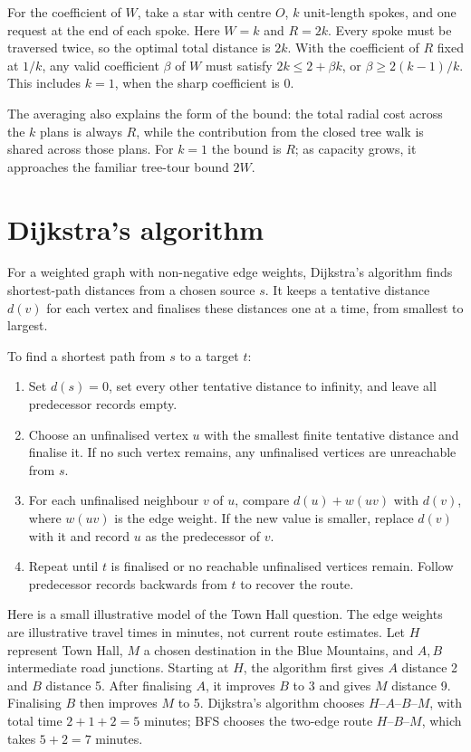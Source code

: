 For the coefficient of $W$, take a star with centre $O$, $k$ unit-length spokes, and one request at the end of each spoke. Here $W=k$ and $R=2k$. Every spoke must be traversed twice, so the optimal total distance is $2k$. With the coefficient of $R$ fixed at $1/k$, any valid coefficient $\beta$ of $W$ must satisfy $2k\leq 2+\beta k$, or $\beta\geq 2(k-1)/k$. This includes $k=1$, when the sharp coefficient is $0$.

The averaging also explains the form of the bound: the total radial cost across the $k$ plans is always $R$, while the contribution from the closed tree walk is shared across those plans. For $k=1$ the bound is $R$; as capacity grows, it approaches the familiar tree-tour bound $2W$.

\section{Dijkstra's algorithm}
For a weighted graph with non-negative edge weights, Dijkstra's algorithm finds shortest-path distances from a chosen source $s$. It keeps a tentative distance $d(v)$ for each vertex and finalises these distances one at a time, from smallest to largest.

To find a shortest path from $s$ to a target $t$:
\begin{enumerate}
\item Set $d(s)=0$, set every other tentative distance to infinity, and leave all predecessor records empty.
\item Choose an unfinalised vertex $u$ with the smallest finite tentative distance and finalise it. If no such vertex remains, any unfinalised vertices are unreachable from $s$.
\item For each unfinalised neighbour $v$ of $u$, compare $d(u)+w(uv)$ with $d(v)$, where $w(uv)$ is the edge weight. If the new value is smaller, replace $d(v)$ with it and record $u$ as the predecessor of $v$.
\item Repeat until $t$ is finalised or no reachable unfinalised vertices remain. Follow predecessor records backwards from $t$ to recover the route.
\end{enumerate}

Here is a small illustrative model of the Town Hall question. The edge weights are illustrative travel times in minutes, not current route estimates. Let $H$ represent Town Hall, $M$ a chosen destination in the Blue Mountains, and $A,B$ intermediate road junctions. Starting at $H$, the algorithm first gives $A$ distance 2 and $B$ distance 5. After finalising $A$, it improves $B$ to 3 and gives $M$ distance 9. Finalising $B$ then improves $M$ to 5. Dijkstra's algorithm chooses $H$--$A$--$B$--$M$, with total time $2+1+2=5$ minutes; BFS chooses the two-edge route $H$--$B$--$M$, which takes $5+2=7$ minutes.

